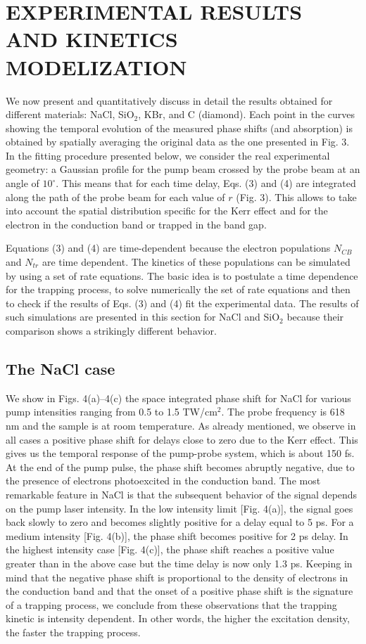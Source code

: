 \documentclass[aps,prb,reprint]{revtex4-2}
\begin{document}
\section{EXPERIMENTAL RESULTS AND KINETICS MODELIZATION}

We now present and quantitatively discuss in detail the results obtained for different materials: NaCl, SiO$_2$, KBr, and C (diamond). Each point in the curves showing the temporal evolution of the measured phase shifts (and absorption) is obtained by spatially averaging the original data as the one presented in Fig. 3. In the fitting procedure presented below, we consider the real experimental geometry: a Gaussian profile for the pump beam crossed by the probe beam at an angle of $10^\circ$. This means that for each time delay, Eqs. (3) and (4) are integrated along the path of the probe beam for each value of $r$ (Fig. 3). This allows to take into account the spatial distribution specific for the Kerr effect and for the electron in the conduction band or trapped in the band gap.

Equations (3) and (4) are time-dependent because the electron populations $N_{CB}$ and $N_{tr}$ are time dependent. The kinetics of these populations can be simulated by using a set of rate equations. The basic idea is to postulate a time dependence for the trapping process, to solve numerically the set of rate equations and then to check if the results of Eqs. (3) and (4) fit the experimental data. The results of such simulations are presented in this section for NaCl and SiO$_2$ because their comparison shows a strikingly different behavior.

\subsection{The NaCl case}

We show in Figs. 4(a)--4(c) the space integrated phase shift for NaCl for various pump intensities ranging from 0.5 to 1.5 TW/cm$^2$. The probe frequency is 618 nm and the sample is at room temperature. As already mentioned, we observe in all cases a positive phase shift for delays close to zero due to the Kerr effect. This gives us the temporal response of the pump-probe system, which is about 150 fs. At the end of the pump pulse, the phase shift becomes abruptly negative, due to the presence of electrons photoexcited in the conduction band. The most remarkable feature in NaCl is that the subsequent behavior of the signal depends on the pump laser intensity. In the low intensity limit [Fig. 4(a)], the signal goes back slowly to zero and becomes slightly positive for a delay equal to 5 ps. For a medium intensity [Fig. 4(b)], the phase shift becomes positive for 2 ps delay. In the highest intensity case [Fig. 4(c)], the phase shift reaches a positive value greater than in the above case but the time delay is now only 1.3 ps. Keeping in mind that the negative phase shift is proportional to the density of electrons in the conduction band and that the onset of a positive phase shift is the signature of a trapping process, we conclude from these observations that the trapping kinetic is intensity dependent. In other words, the higher the excitation density, the faster the trapping process.
\end{document}

